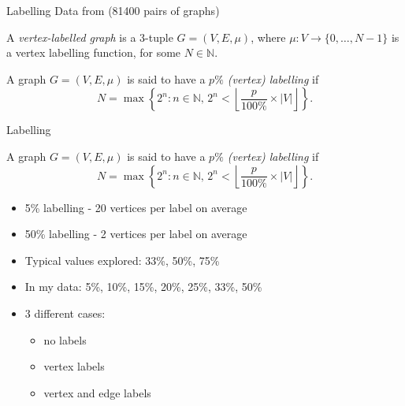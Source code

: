 \documentclass{beamer}
\begin{document}
\begin{frame}{Labelling}
  Data from \cite{foggia2001-2, DBLP:journals/prl/SantoFSV03}
  (\num{81400} pairs of graphs)
  \pause
  \begin{definition}
    A \emph{vertex-labelled graph} is a 3-tuple $G = (V, E, \mu)$, where $\mu
    \colon V \to \{ 0, \dots, N - 1 \}$ is a vertex labelling function, for some
    $N \in \mathbb{N}$.
  \end{definition}
  \pause
  \begin{definition}
    A graph $G = (V, E, \mu)$ is said to have a \emph{$p\%$ (vertex) labelling} if
    \[ N = \max \left\{ 2^n : n \in \mathbb{N},\, 2^n < \left\lfloor \frac{p}{100\%}
          \times |V| \right\rfloor \right\}. \]
  \end{definition}
\end{frame}

\begin{frame}{Labelling}
  \begin{definition}
    A graph $G = (V, E, \mu)$ is said to have a \emph{$p\%$ (vertex) labelling} if
    \[ N = \max \left\{ 2^n : n \in \mathbb{N},\, 2^n < \left\lfloor \frac{p}{100\%}
          \times |V| \right\rfloor \right\}. \]
  \end{definition}
  \begin{itemize}
  \item 5\% labelling - 20 vertices per label on average
  \item 50\% labelling - 2 vertices per label on average
    \pause
  \item Typical values explored: 33\%, 50\%, 75\%
    \pause
  \item In my data: 5\%, 10\%, 15\%, 20\%, 25\%, 33\%, 50\%
    \pause
  \item 3 different cases:
    \begin{itemize}
    \item no labels
    \item vertex labels
    \item vertex and edge labels
    \end{itemize}
  \end{itemize}
\end{frame}
\end{document}
